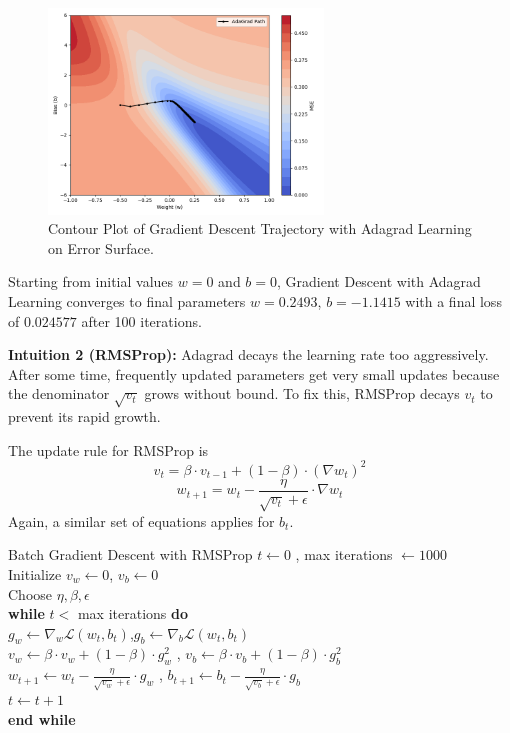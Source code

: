 \begin{figure}[h!]
    \centering
    \includegraphics[width=0.65\textwidth]{content/section01/chapter01/figs/adagrad_gd_contour.png}
    \caption{Contour Plot of Gradient Descent Trajectory with Adagrad Learning on Error Surface.}
\end{figure}

Starting from initial values \( w = 0 \) and \( b = 0 \), Gradient Descent with Adagrad Learning converges to final parameters \( w = 0.2493 \), \( b = -1.1415 \) with a final loss of \( 0.024577 \) after 100 iterations.


\textbf{Intuition 2 (RMSProp):} Adagrad decays the learning rate too aggressively. After some time, frequently updated parameters get very small updates because the denominator \( \sqrt{v_t} \) grows without bound. To fix this, RMSProp decays \( v_t \) to prevent its rapid growth.

The update rule for RMSProp is
\[
v_t = \beta \cdot v_{t-1} + (1 - \beta) \cdot (\nabla w_t)^2
\]
\[
w_{t+1} = w_t - \frac{\eta}{\sqrt{v_t} + \epsilon} \cdot \nabla w_t
\]
Again, a similar set of equations applies for \( b_t \).

\begin{algobox}{Batch Gradient Descent with RMSProp}
\( t \gets 0 \) , max iterations \( \gets 1000 \) \\
Initialize \( v_w \gets 0 \), \( v_b \gets 0 \) \\
Choose \( \eta, \beta, \epsilon \) \\
\textbf{while} \( t < \) max iterations \textbf{do} \\
\hspace*{1em} \( g_w \gets \nabla_w \mathcal{L}(w_t, b_t) \),\quad \( g_b \gets \nabla_b \mathcal{L}(w_t, b_t) \) \\
\hspace*{1em} \( v_w \gets \beta \cdot v_w + (1 - \beta) \cdot g_w^2 \) , \quad \( v_b \gets \beta \cdot v_b + (1 - \beta) \cdot g_b^2 \) \\
\hspace*{1em} \( w_{t+1} \gets w_t - \frac{\eta}{\sqrt{v_w} + \epsilon} \cdot g_w \) , \quad \( b_{t+1} \gets b_t - \frac{\eta}{\sqrt{v_b} + \epsilon} \cdot g_b \) \\
\hspace*{1em} \( t \gets t + 1 \) \\
\textbf{end while}
\end{algobox}


